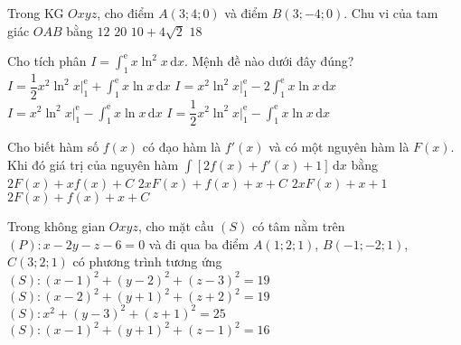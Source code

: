 \begin{ex}%
Trong KG $Oxyz$, cho điểm $A(3;4;0)$ và điểm $B(3;-4;0)$. Chu vi của tam giác $OAB$ bằng
\choice
{$12$}
{$20$}
{$10+4\sqrt{2}$}
{\True $18$}
\end{ex}

\begin{ex}%
Cho tích phân $I=\displaystyle\int_1^{\mathrm{e}} x\ln^2 x \mathrm{\,d}x$. Mệnh đề nào dưới đây đúng?
\choice
{$I=\dfrac{1}{2} x^2\ln^2 x\bigg|_1^{\mathrm{e}}+\displaystyle\int_1^{\mathrm{e}} x\ln x \mathrm{\,d}x$}
{$I=x^2\ln^2 x\bigg|_1^{\mathrm{e}}-2\displaystyle\int_1^{\mathrm{e}} x\ln x \mathrm{\,d}x$}
{$I=x^2\ln^2 x\bigg|_1^{\mathrm{e}}-\displaystyle\int_1^{\mathrm{e}} x\ln x \mathrm{\,d}x$}
{\True $I=\dfrac{1}{2} x^2\ln^2 x\bigg|_1^{\mathrm{e}}-\displaystyle\int_1^{\mathrm{e}} x\ln x \mathrm{\,d}x$}
\end{ex}

\begin{ex}%
Cho biết hàm số $f(x)$ có đạo hàm là $f'(x)$ và có một nguyên hàm là $F(x)$. Khi đó giá trị của nguyên hàm $\displaystyle\int\left[2 f(x)+f'(x)+1\right]\mathrm{\,d}x$ bằng
\choice
{$2 F(x)+x f(x)+C$}
{$2x F(x)+f(x)+x+C$}
{$2x F(x)+x+1$}
{\True $2 F(x)+f(x)+x+C$}
\end{ex}

\begin{ex}%
Trong không gian $ Oxyz $, cho mặt cầu $ (S) $ có tâm nằm trên $ (P):x-2y-z-6=0$ và đi qua ba điểm $ A(1 ; 2 ; 1) $, $ B(-1 ; -2 ; 1) $, $ C(3 ; 2 ; 1) $ có phương trình tương ứng
\choice
{$ (S): (x-1)^2+(y-2)^2+(z-3)^2=19$}
{\True $ (S): (x-2)^2+(y+1)^2+(z+2)^2=19$}
{$ (S): x^2+(y-3)^2+(z+1)^2=25$}
{$ (S): (x-1)^2+(y+1)^2+(z-1)^2=16$}
\end{ex}

